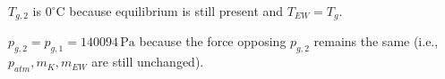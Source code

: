 \( T_{g,2} \) is \( 0^\circ \text{C} \) because equilibrium is still present and \( T_{EW} = T_g \).  

\( p_{g,2} = p_{g,1} = 140094 \, \text{Pa} \) because the force opposing \( p_{g,2} \) remains the same (i.e., \( p_{atm}, m_K, m_{EW} \) are still unchanged).